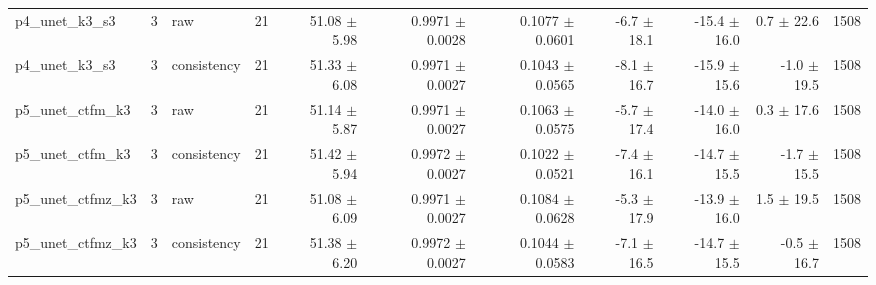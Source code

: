 \begin{tabular}{lllrrrrrrrr}
p4\_unet\_k3\_s3 & 3 & raw & 21 & 51.08 $\pm$ 5.98 & 0.9971 $\pm$ 0.0028 & 0.1077 $\pm$ 0.0601 & -6.7 $\pm$ 18.1 & -15.4 $\pm$ 16.0 & 0.7 $\pm$ 22.6 & 1508 \\
p4\_unet\_k3\_s3 & 3 & consistency & 21 & 51.33 $\pm$ 6.08 & 0.9971 $\pm$ 0.0027 & 0.1043 $\pm$ 0.0565 & -8.1 $\pm$ 16.7 & -15.9 $\pm$ 15.6 & -1.0 $\pm$ 19.5 & 1508 \\
p5\_unet\_ctfm\_k3 & 3 & raw & 21 & 51.14 $\pm$ 5.87 & 0.9971 $\pm$ 0.0027 & 0.1063 $\pm$ 0.0575 & -5.7 $\pm$ 17.4 & -14.0 $\pm$ 16.0 & 0.3 $\pm$ 17.6 & 1508 \\
p5\_unet\_ctfm\_k3 & 3 & consistency & 21 & 51.42 $\pm$ 5.94 & 0.9972 $\pm$ 0.0027 & 0.1022 $\pm$ 0.0521 & -7.4 $\pm$ 16.1 & -14.7 $\pm$ 15.5 & -1.7 $\pm$ 15.5 & 1508 \\
p5\_unet\_ctfmz\_k3 & 3 & raw & 21 & 51.08 $\pm$ 6.09 & 0.9971 $\pm$ 0.0027 & 0.1084 $\pm$ 0.0628 & -5.3 $\pm$ 17.9 & -13.9 $\pm$ 16.0 & 1.5 $\pm$ 19.5 & 1508 \\
p5\_unet\_ctfmz\_k3 & 3 & consistency & 21 & 51.38 $\pm$ 6.20 & 0.9972 $\pm$ 0.0027 & 0.1044 $\pm$ 0.0583 & -7.1 $\pm$ 16.5 & -14.7 $\pm$ 15.5 & -0.5 $\pm$ 16.7 & 1508 \\
\bottomrule
\end{tabular}
